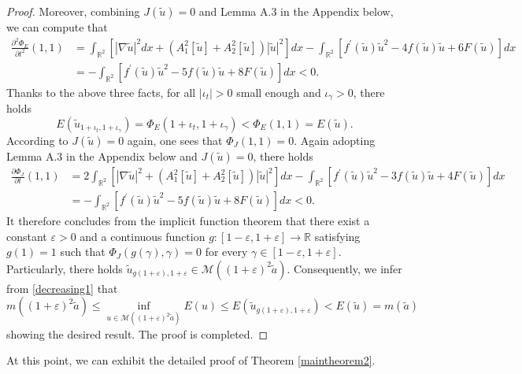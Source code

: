 \documentclass[11pt]{amsart}
\numberwithin{equation}{section}
\theoremstyle{definition}
\newcommand{\R}{\mathbb{R}}
\begin{document}
\begin{proof}
Moreover, combining $J(\tilde{u})=0$ and Lemma A.3 in the Appendix below,
 we can compute that
\begin{align*}
 \frac{\partial^2\Phi_E}{\partial t^2}(1,1)&=\int_{\R^2}[ |\nabla \tilde{u}|^2dx+
  (A_1^2[\tilde{u}]+A_2^2[\tilde{u}])|\tilde{u}|^2]dx-
 \int_{\R^2}[f^\prime( \tilde{u})\tilde{u}^2-4f( \tilde{u})\tilde{u}+6F(\tilde{u})]dx   \\
   & = - \int_{\R^2}[f^\prime( \tilde{u})\tilde{u}^2-5f( \tilde{u})\tilde{u}+8F(\tilde{u})]dx<0.
\end{align*}
Thanks to the above three facts, for all  $|\iota_t|>0$ small enough and $\iota_\gamma>0$, there holds
\begin{equation}\label{decreasing1}
E(\tilde{u}_{1+\iota_t,1+\iota_\gamma})=  \Phi_E(1+\iota_t,1+\iota_\gamma)<\Phi_E(1,1)=E(\tilde{u}).
\end{equation}
According to $J(\tilde{u})=0$ again, one sees that $\Phi_J(1,1)=0$. Again
adopting Lemma A.3 in the Appendix below and $J(\tilde{u})=0$, there holds
\begin{align*}
  \frac{\partial\Phi_J}{\partial t}(1,1)  & =2\int_{\R^2}[  |\nabla \tilde{u}|^2+
 (A_1^2[\tilde{u}]+A_2^2[\tilde{u}])|\tilde{u}|^2]dx-
\int_{\R^2}[f^\prime( \tilde{u})\tilde{u}^2-3f( \tilde{u})\tilde{u}+4F(\tilde{u})]dx   \\
    & = - \int_{\R^2}[f^\prime( \tilde{u})\tilde{u}^2-5f( \tilde{u})\tilde{u}+8F(\tilde{u})]dx<0.
\end{align*}
It therefore concludes from the implicit function theorem that there exist a constant $\varepsilon>0$
and a continuous function $g:[1-\varepsilon,1+\varepsilon]\to \R$ satisfying $g(1)=1$
such that $\Phi_J(g(\gamma),\gamma)=0$ for every $\gamma\in[1-\varepsilon,1+\varepsilon]$.
Particularly, there holds $\tilde{u}_{g(1+\varepsilon),1+\varepsilon}\in \mathcal{M}((1+\varepsilon)^2\tilde{a})$.
Consequently, we infer from \eqref{decreasing1} that
\[
m((1+\varepsilon)^2\tilde{a})\leq \inf_{u\in \mathcal{M}((1+\varepsilon)^2\tilde{a})}E(u)\leq E(\tilde{u}_{g(1+\varepsilon),1+\varepsilon})
<E(\tilde{u})=m(\tilde{a})
\]
showing the desired result. The proof is completed.
\end{proof}

At this point, we can exhibit the detailed proof of Theorem \ref{maintheorem2}.
\end{document}
